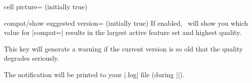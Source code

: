 {\begin{pgfplotskey}{cell picture= (initially true)}
\end{pgfplotskey}

\begin{pgfplotskey}{compat/show suggested version= (initially true)}
	If enabled, \PGFPlots\ will show you which value for |compat=| results in the largest active feature set and highest quality.
	
	This key will generate a warning if the current version is so old that the quality degrades seriously.

	The notification will be printed to your |.log| file (during ||).
\end{pgfplotskey}
}

